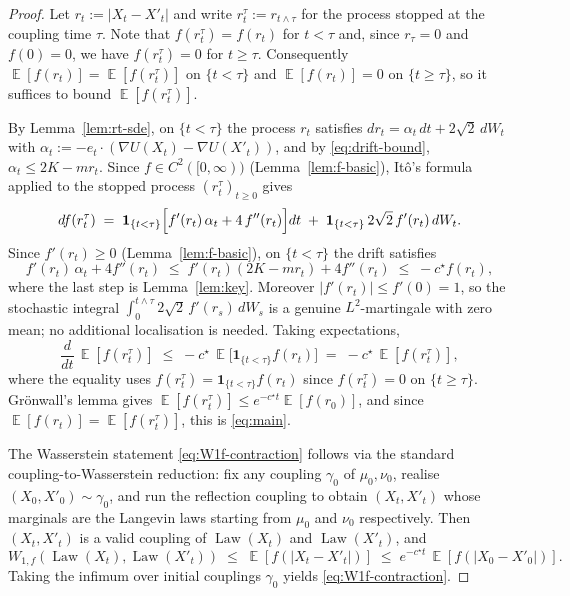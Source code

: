 \documentclass[11pt]{article}
\theoremstyle{definition}
\DeclareMathOperator{\E}{\mathbb{E}}
\DeclareMathOperator{\Law}{Law}
\newcommand{\abs}[1]{\left\lvert #1 \right\rvert}
\begin{document}
\begin{proof}
Let $r_t := \abs{X_t - X'_t}$ and write $r_t^\tau := r_{t \wedge \tau}$ for the process stopped at the coupling time $\tau$. Note that $f(r_t^\tau) = f(r_t)$ for $t < \tau$ and, since $r_\tau = 0$ and $f(0) = 0$, we have $f(r_t^\tau) = 0$ for $t \ge \tau$. Consequently $\E[f(r_t)] = \E[f(r_t^\tau)]$ on $\{t < \tau\}$ and $\E[f(r_t)] = 0$ on $\{t \ge \tau\}$, so it suffices to bound $\E[f(r_t^\tau)]$.

By Lemma~\ref{lem:rt-sde}, on $\{t < \tau\}$ the process $r_t$ satisfies $dr_t = \alpha_t\,dt + 2\sqrt 2\,dW_t$ with $\alpha_t := -e_t \cdot (\nabla U(X_t) - \nabla U(X'_t))$, and by \eqref{eq:drift-bound}, $\alpha_t \le 2K - m r_t$. Since $f \in C^2([0,\infty))$ (Lemma~\ref{lem:f-basic}), It\^o's formula applied to the stopped process $(r_t^\tau)_{t \ge 0}$ gives
\[
d f(r_t^\tau) \;=\; \mathbf{1}_{\{t < \tau\}}\Bigl[f'(r_t)\,\alpha_t + 4\, f''(r_t)\Bigr] dt \;+\; \mathbf{1}_{\{t < \tau\}}\, 2\sqrt 2\, f'(r_t)\, dW_t.
\]
Since $f'(r_t) \ge 0$ (Lemma~\ref{lem:f-basic}), on $\{t < \tau\}$ the drift satisfies
\[
f'(r_t)\,\alpha_t + 4 f''(r_t) \;\le\; f'(r_t)(2K - m r_t) + 4 f''(r_t) \;\le\; -c^\star f(r_t),
\]
where the last step is Lemma~\ref{lem:key}. Moreover $\abs{f'(r_t)} \le f'(0) = 1$, so the stochastic integral $\int_0^{t \wedge \tau} 2\sqrt 2\, f'(r_s)\, dW_s$ is a genuine $L^2$-martingale with zero mean; no additional localisation is needed. Taking expectations,
\[
\frac{d}{dt}\,\E[f(r_t^\tau)] \;\le\; -c^\star\,\E\bigl[\mathbf{1}_{\{t < \tau\}} f(r_t)\bigr] \;=\; -c^\star\,\E[f(r_t^\tau)],
\]
where the equality uses $f(r_t^\tau) = \mathbf{1}_{\{t < \tau\}} f(r_t)$ since $f(r_t^\tau) = 0$ on $\{t \ge \tau\}$. Gr\"onwall's lemma gives $\E[f(r_t^\tau)] \le e^{-c^\star t}\E[f(r_0)]$, and since $\E[f(r_t)] = \E[f(r_t^\tau)]$, this is \eqref{eq:main}.

The Wasserstein statement \eqref{eq:W1f-contraction} follows via the standard coupling-to-Wasserstein reduction: fix any coupling $\gamma_0$ of $\mu_0, \nu_0$, realise $(X_0, X'_0) \sim \gamma_0$, and run the reflection coupling to obtain $(X_t, X'_t)$ whose marginals are the Langevin laws starting from $\mu_0$ and $\nu_0$ respectively. Then $(X_t, X'_t)$ is a valid coupling of $\Law(X_t)$ and $\Law(X'_t)$, and
\[
W_{1,f}(\Law(X_t), \Law(X'_t)) \;\le\; \E[f(\abs{X_t - X'_t})] \;\le\; e^{-c^\star t}\,\E[f(\abs{X_0 - X'_0})].
\]
Taking the infimum over initial couplings $\gamma_0$ yields \eqref{eq:W1f-contraction}.
\end{proof}
\end{document}
